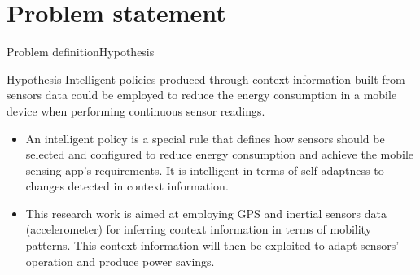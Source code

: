 \documentclass[10pt,xcolor={dvipsnames},handout]{beamer}
\begin{document}
\section{Problem statement}
\begin{frame}{Problem definition}{Hypothesis}
\begin{exampleblock}{Hypothesis}
Intelligent policies produced through context information built from sensors data could be employed to reduce the energy consumption in a mobile device when performing continuous sensor readings.
\end{exampleblock}
{
\small
\pause
\begin{itemize}
  \item An intelligent policy is a special rule that defines how sensors should be selected and configured to reduce energy consumption and achieve the mobile sensing app's requirements.
  It is intelligent in terms of self-adaptness to changes detected in context information.
  \pause
  \item This research work is aimed at employing GPS and inertial sensors data (accelerometer) for inferring context information in terms of mobility patterns.
  This context information will then be exploited to adapt sensors' operation and produce power savings.
\end{itemize}
}
\end{frame}
\end{document}
